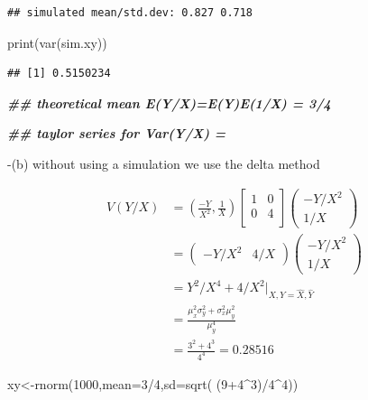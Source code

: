 \documentclass[
]{book}
\newenvironment{Shaded}{\begin{snugshade}}{\end{snugshade}}
\newcommand{\AttributeTok}[1]{\textcolor[rgb]{0.77,0.63,0.00}{#1}}
\newcommand{\DecValTok}[1]{\textcolor[rgb]{0.00,0.00,0.81}{#1}}
\newcommand{\DocumentationTok}[1]{\textcolor[rgb]{0.56,0.35,0.01}{\textbf{\textit{#1}}}}
\newcommand{\FunctionTok}[1]{\textcolor[rgb]{0.00,0.00,0.00}{#1}}
\newcommand{\NormalTok}[1]{#1}
\newcommand{\OtherTok}[1]{\textcolor[rgb]{0.56,0.35,0.01}{#1}}
\newcommand{\SpecialCharTok}[1]{\textcolor[rgb]{0.00,0.00,0.00}{#1}}
\theoremstyle{definition}
\theoremstyle{definition}
\theoremstyle{definition}
\theoremstyle{definition}
\theoremstyle{remark}
\begin{document}
\begin{verbatim}
## simulated mean/std.dev: 0.827 0.718
\end{verbatim}

\begin{Shaded}
\begin{Highlighting}[]
 \FunctionTok{print}\NormalTok{(}\FunctionTok{var}\NormalTok{(sim.xy))}
\end{Highlighting}
\end{Shaded}

\begin{verbatim}
## [1] 0.5150234
\end{verbatim}

\begin{Shaded}
\begin{Highlighting}[]
 \DocumentationTok{\#\# theoretical mean  E(Y/X)=E(Y)E(1/X) = 3/4}
 
 \DocumentationTok{\#\# taylor series for Var(Y/X) = }
\end{Highlighting}
\end{Shaded}

-(b) without using a simulation we use the delta method

\[
\begin{aligned}
V(Y/X)&=(\frac{-Y}{X^2},\frac{1}{X})\begin{bmatrix} 1 & 0\\
0 & 4\\
\end{bmatrix}\begin{pmatrix} -Y/X^2 \\ 1/X \end{pmatrix}\\
&=\begin{pmatrix} -Y/X^2 & 4/X \end{pmatrix}\begin{pmatrix} -Y/X^2 \\ 1/X \end{pmatrix}\\
&= Y^2/X^4 +4/X^2 |_{X,Y=\hat{X},\hat{Y}} \\
&= \frac{\mu_x^2\sigma_y^2 +\sigma_x^2\mu_y^2}{\mu_y^4}\\
&= \frac{3^2+4^3}{4^4} = 0.28516
\end{aligned}
\]

\begin{Shaded}
\begin{Highlighting}[]
\NormalTok{  xy}\OtherTok{\textless{}{-}}\FunctionTok{rnorm}\NormalTok{(}\DecValTok{1000}\NormalTok{,}\AttributeTok{mean=}\DecValTok{3}\SpecialCharTok{/}\DecValTok{4}\NormalTok{,}\AttributeTok{sd=}\FunctionTok{sqrt}\NormalTok{( (}\DecValTok{9}\SpecialCharTok{+}\DecValTok{4}\SpecialCharTok{\^{}}\DecValTok{3}\NormalTok{)}\SpecialCharTok{/}\DecValTok{4}\SpecialCharTok{\^{}}\DecValTok{4}\NormalTok{))}
\end{Highlighting}
\end{Shaded}
\end{document}
